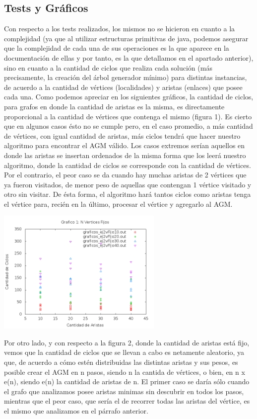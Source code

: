 \subsection{Tests y Gráficos}
Con respecto a los tests realizados, los mismos no se hicieron en cuanto a la complejidad (ya que al utilizar estructuras primitivas de java, podemos asegurar que la complejidad de cada una de sus operaciones es la que aparece en la documentación de ellas y por tanto, es la que detallamos en el apartado anterior), sino en cuanto a la cantidad de ciclos que realiza cada solución (más precisamente, la creación del árbol generador mínimo) para distintas instancias, de acuerdo a la cantidad de vértices (localidades) y aristas (enlaces) que posee cada una.
Como podemos apreciar en los siguientes gráficos, la cantidad de ciclos, para grafos en donde la cantidad de aristas es la misma, es directamente proporcional a la cantidad de vértices que contenga el mismo (figura 1). Es cierto que en algunos casos ésto no se cumple pero, en el caso promedio, a más cantidad de vértices, con igual cantidad de aristas, más ciclos tendrá que hacer nuestro algoritmo para encontrar el AGM válido. Los casos extremos serían aquellos en donde las aristas se insertan ordenados de la misma forma que los leerá nuestro algoritmo, donde la cantidad de ciclos se corresponde con la cantidad de vértices. Por el contrario, el peor caso se da cuando hay muchas aristas de 2 vértices que ya fueron visitados, de menor peso de aquellas que contengan 1 vértice visitado y otro sin visitar. De ésta forma, el algoritmo hará tantos ciclos como aristas tenga el vértice para, recién en la último, procesar el vértice y agregarlo al AGM.
\begin {center}
\includegraphics[width=8cm]{./graficos/grafico_vfijo.png}
\end {center} 
Por otro lado, y con respecto a la figura 2, donde la cantidad de aristas está fijo, vemos que la cantidad de ciclos que se llevan a cabo es netamente aleatorio, ya que, de acuerdo a cómo estén distribuidas las distintas aristas y sus pesos, es posible crear el AGM en n pasos, siendo n la cantida de vértices, o bien, en n x e(n), siendo e(n) la cantidad de aristas de n. El primer caso se daría sólo cuando el grafo que analizamos posee aristas minimas sin descubrir en todos los pasos, mientras que el peor caso, que sería el de recorrer todas las aristas del vértice, es el mismo que analizamos en el párrafo anterior.

